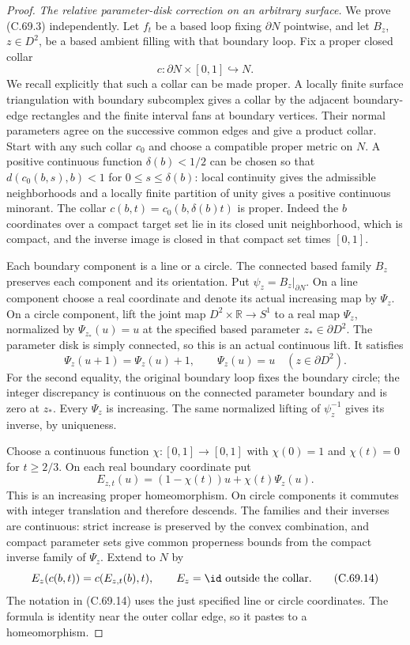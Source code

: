 \begin{proof}
\emph{The relative parameter-disk correction on an arbitrary surface.}
We prove (C.69.3) independently.
Let $f_t$ be a based loop fixing
$\partial N$ pointwise, and let
$B_z$, $z\in D^2$, be a based
ambient filling with that boundary
loop.
Fix a proper closed collar
\[
                     c:\partial N\times[0,1]\hookrightarrow N .
                                                               \tag{C.69.11}
\]
We recall explicitly that such
a collar can be made proper.
A locally finite surface
triangulation with boundary
subcomplex gives a collar by
the adjacent boundary-edge
rectangles and the finite
interval fans at boundary vertices.
Their normal parameters agree
on the successive common edges
and give a product collar.
Start with any such collar
$c_0$ and choose a compatible
proper metric on $N$.
A positive continuous function
$\delta(b)<1/2$ can be chosen
so that
$d(c_0(b,s),b)<1$ for
$0\leq s\leq\delta(b)$:
local continuity gives the
admissible neighborhoods and
a locally finite partition
of unity gives a positive
continuous minorant.
The collar
$c(b,t)=c_0(b,\delta(b)t)$
is proper. Indeed the $b$
coordinates over a compact
target set lie in its closed
unit neighborhood, which is
compact, and the inverse
image is closed in that
compact set times $[0,1]$.

Each boundary component is
a line or a circle. The
connected based family $B_z$
preserves each component and
its orientation. Put
$\psi_z=B_z|_{\partial N}$.
On a line component choose
a real coordinate and denote
its actual increasing map
by $\Psi_z$.
On a circle component, lift
the joint map
$D^2\times\mathbb R\to S^1$
to a real map $\Psi_z$,
normalized by
$\Psi_{z_*}(u)=u$ at the
specified based parameter
$z_*\in\partial D^2$.
The parameter disk is simply
connected, so this is an
actual continuous lift.
It satisfies
\[
 \Psi_z(u+1)=\Psi_z(u)+1,\qquad
             \Psi_z(u)=u\quad(z\in\partial D^2).
                                                               \tag{C.69.12}
\]
For the second equality,
the original boundary loop
fixes the boundary circle;
the integer discrepancy
is continuous on the connected
parameter boundary and is
zero at $z_*$.
Every $\Psi_z$ is increasing.
The same normalized lifting
of $\psi_z^{-1}$ gives its
inverse, by uniqueness.

Choose a continuous function
$\chi:[0,1]\to[0,1]$ with
$\chi(0)=1$ and $\chi(t)=0$
for $t\geq2/3$.
On each real boundary
coordinate put
\[
             E_{z,t}(u)
                  =(1-\chi(t))u+\chi(t)\Psi_z(u).
                                                               \tag{C.69.13}
\]
This is an increasing proper
homeomorphism. On circle
components it commutes with
integer translation and
therefore descends.
The families and their
inverses are continuous:
strict increase is preserved
by the convex combination,
and compact parameter sets
give common properness bounds
from the compact inverse family
of $\Psi_z$.
Extend to $N$ by
\[
 E_z(c(b,t))=c(E_{z,t}(b),t),\qquad
                  E_z=\id\text{ outside the collar}.
                                                               \tag{C.69.14}
\]
The notation in (C.69.14)
uses the just specified
line or circle coordinates.
The formula is identity
near the outer collar edge,
so it pastes to a homeomorphism.


\end{proof}
